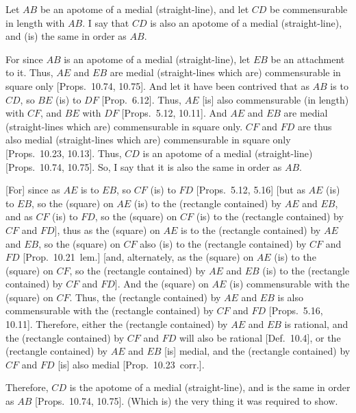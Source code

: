 \begin{Parallel}{}{}
{\epsfysize=0.7in
\centerline{}

Let $AB$ be an apotome of a medial (straight-line), and let $CD$
be commensurable in length with $AB$. I say that $CD$ is also an
apotome of a medial (straight-line), and (is) the same in order as $AB$.

For since $AB$ is an apotome of a medial (straight-line), let $EB$ be
an attachment to it. Thus, $AE$ and $EB$ are medial (straight-lines which are) commensurable in square only [Props.~10.74, 10.75]. And let it have been contrived that as
$AB$ is to $CD$, so $BE$ (is) to $DF$ [Prop.~6.12]. 
Thus, $AE$ [is] also commensurable (in length) with $CF$, and $BE$
with $DF$ [Props.~5.12, 10.11]. And $AE$ and $EB$ are medial (straight-lines which are) commensurable in square only. $CF$ and $FD$
are thus also medial (straight-lines which are) commensurable in square only
[Props.~10.23, 10.13]. 
Thus, $CD$ is an apotome of a medial (straight-line) [Props.~10.74, 10.75].
So, I say that it is also the same in order as $AB$.

\mbox{[}For] since as $AE$ is to $EB$, so $CF$ (is) to $FD$ [Props.~5.12, 5.16] [but
as $AE$ (is) to $EB$, so the (square) on $AE$ (is) to the (rectangle
contained) by $AE$ and $EB$, and as $CF$ (is) to $FD$, so the
(square) on $CF$ (is) to the (rectangle contained) by $CF$ and $FD$],
thus as  the (square) on $AE$ is to the (rectangle contained) by $AE$
and $EB$, so the (square) on $CF$ also (is) to the (rectangle contained)
by $CF$ and $FD$ [Prop.~10.21~lem.] [and,
alternately, as the (square) on $AE$ (is) to the (square) on $CF$, so
the (rectangle contained) by $AE$ and $EB$ (is) to the (rectangle contained)
by $CF$ and $FD$]. And the (square) on $AE$ (is) commensurable
with the (square) on $CF$. Thus, the (rectangle contained) by $AE$ and
$EB$ is also commensurable with the (rectangle contained) by $CF$ and
$FD$ [Props.~5.16, 10.11].
Therefore, either the (rectangle contained) by $AE$ and $EB$ is rational, and
the (rectangle contained) by $CF$ and $FD$ will also be rational [Def.~10.4], or
the (rectangle contained) by $AE$ and $EB$ [is] medial, and the
(rectangle contained) by $CF$ and $FD$ [is] also medial [Prop.~10.23~corr.].

Therefore, $CD$ is the apotome of a medial (straight-line), and is
the same in order as $AB$ [Props.~10.74, 10.75]. (Which is) the very thing it was required to show.}
\end{Parallel}

